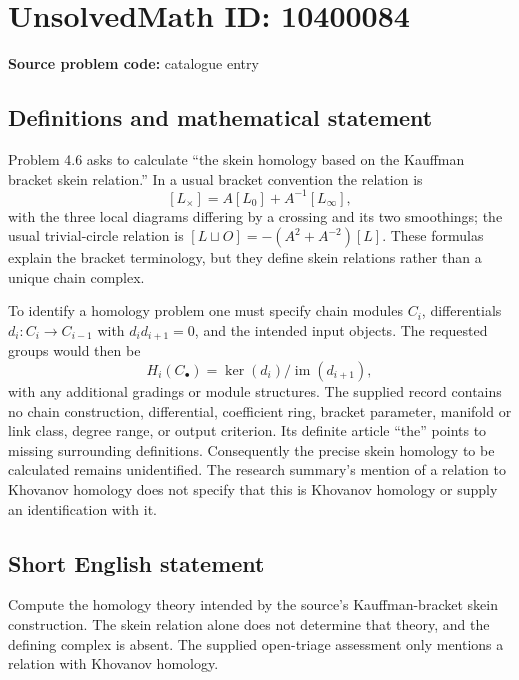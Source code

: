 \documentclass[11pt]{article}
\begin{document}
\section*{UnsolvedMath ID: 10400084}
\textbf{Source problem code:} catalogue entry
\subsection{Definitions and mathematical statement}
Problem 4.6 asks to calculate ``the skein homology based on the Kauffman bracket skein relation.'' In a usual bracket convention the relation is
\[
 [L_{\times}]=A[L_0]+A^{-1}[L_{\infty}],
\]
with the three local diagrams differing by a crossing and its two smoothings; the usual trivial-circle relation is \([L\sqcup O]=-(A^2+A^{-2})[L]\). These formulas explain the bracket terminology, but they define skein relations rather than a unique chain complex.

To identify a homology problem one must specify chain modules \(C_i\), differentials \(d_i:C_i\to C_{i-1}\) with \(d_i d_{i+1}=0\), and the intended input objects. The requested groups would then be
\[
 H_i(C_\bullet)=\ker(d_i)/\operatorname{im}(d_{i+1}),
\]
with any additional gradings or module structures. The supplied record contains no chain construction, differential, coefficient ring, bracket parameter, manifold or link class, degree range, or output criterion. Its definite article ``the'' points to missing surrounding definitions. Consequently the precise skein homology to be calculated remains unidentified. The research summary's mention of a relation to Khovanov homology does not specify that this is Khovanov homology or supply an identification with it.
\subsection{Short English statement}
Compute the homology theory intended by the source's Kauffman-bracket skein construction. The skein relation alone does not determine that theory, and the defining complex is absent. The supplied open-triage assessment only mentions a relation with Khovanov homology.
\end{document}
